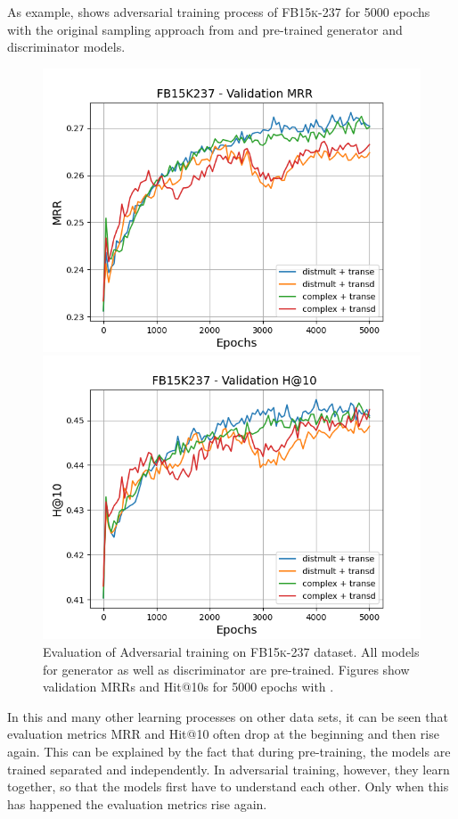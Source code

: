 As example,  shows adversarial training process of \textsc{FB15k-237} for 5000 epochs with the original sampling approach from \kbgan and pre-trained  generator and discriminator models.
\begin{figure}
    \centering
    \begin{minipage}{.5\textwidth}
      \centering
      \includegraphics[width=0.9\linewidth]{figures/results/gan_train/pretrained/random/fb15k237/gan_train_random_fb15k237_mrrs.png}
    \end{minipage}%
    \begin{minipage}{.5\textwidth}
      \centering
      \includegraphics[width=0.9\linewidth]{figures/results/gan_train/pretrained/random/fb15k237/gan_train_random_fb15k237_hit10s.png}
    \end{minipage}
    \caption{Evaluation of Adversarial training on \textsc{FB15k-237} dataset.
    All models for generator as well as discriminator are pre-trained.
    Figures show validation MRRs and Hit@10s for 5000 epochs with \origsampling.}
    \label{fig:original_pretrained_advtrain}
\end{figure}
In this and many other learning processes on other data sets, it can be seen that evaluation metrics MRR and Hit@10 often drop at the beginning and then rise again.
This can be explained by the fact that during pre-training, the models are trained separated and independently.
In adversarial training, however, they learn together, so that the models first have to understand each other.
Only when this has happened the evaluation metrics rise again.

